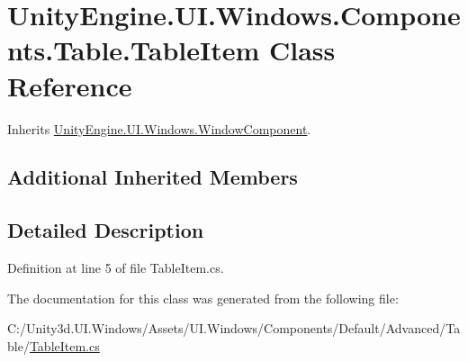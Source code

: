 \hypertarget{class_unity_engine_1_1_u_i_1_1_windows_1_1_components_1_1_table_1_1_table_item}{}\section{Unity\+Engine.\+U\+I.\+Windows.\+Components.\+Table.\+Table\+Item Class Reference}
\label{class_unity_engine_1_1_u_i_1_1_windows_1_1_components_1_1_table_1_1_table_item}


Inherits \hyperlink{class_unity_engine_1_1_u_i_1_1_windows_1_1_window_component}{Unity\+Engine.\+U\+I.\+Windows.\+Window\+Component}.

\subsection*{Additional Inherited Members}


\subsection{Detailed Description}


Definition at line 5 of file Table\+Item.\+cs.



The documentation for this class was generated from the following file\+:\begin{DoxyCompactItemize}
\item 
C\+:/\+Unity3d.\+U\+I.\+Windows/\+Assets/\+U\+I.\+Windows/\+Components/\+Default/\+Advanced/\+Table/\hyperlink{_table_item_8cs}{Table\+Item.\+cs}\end{DoxyCompactItemize}

